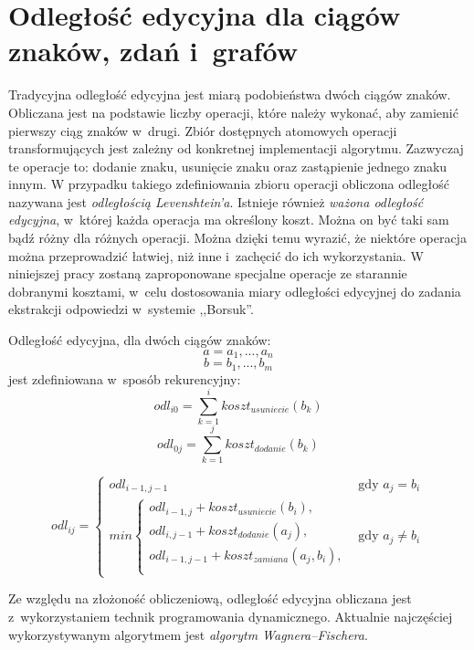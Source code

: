 \documentclass[a4paper, twoside, openright, 12pt]{report}
\begin{document}
    \section{Odległość edycyjna dla ciągów znaków, zdań i~grafów}
        Tradycyjna odległość edycyjna jest miarą podobieństwa dwóch ciągów znaków. Obliczana jest na podstawie liczby
        operacji, które należy wykonać, aby zamienić pierwszy ciąg znaków w~drugi. Zbiór dostępnych atomowych operacji
        transformujących jest zależny od konkretnej implementacji algorytmu. Zazwyczaj te operacje to: dodanie znaku,
        usunięcie znaku oraz zastąpienie jednego znaku innym. W przypadku takiego zdefiniowania zbioru operacji
        obliczona odległość nazywana jest \emph{odległością  Levenshtein'a}. Istnieje również \emph{ważona odległość edycyjna},
        w~której każda operacja ma określony koszt. Można on być taki sam bądź różny dla różnych operacji. Można dzięki
        temu wyrazić, że niektóre operacja można przeprowadzić łatwiej, niż inne i~zachęcić do ich wykorzystania.
        W niniejszej pracy zostaną zaproponowane specjalne operacje ze starannie dobranymi kosztami, w~celu dostosowania
        miary odległości edycyjnej do zadania ekstrakcji odpowiedzi w~systemie ,,Borsuk''.

        Odległość edycyjna, dla dwóch ciągów znaków:
        $$ a = a_1, ..., a_n $$
        $$ b = b_1, ..., b_m $$
        jest zdefiniowana w~sposób rekurencyjny\cite{CORMEN}:
            $$ odl_{i0} = \sum\limits_{k=1}^{i} koszt_{usuniecie}(b_k) $$
            $$ odl_{0j} = \sum\limits_{k=1}^{j} koszt_{dodanie}(b_k) $$

            \[
             odl_{ij} =
              \begin{cases}
                  odl_{i-1,j-1} & \text{gdy } a_j = b_i \\
                  min
                    \begin{cases}
                        odl_{i-1,j} + koszt_{usuniecie}(b_i), \\
                        odl_{i,j-1} + koszt_{dodanie}(a_j), \\
                        odl_{i-1,j-1} + koszt_{zamiana}(a_j, b_i), \\
                    \end{cases}
                    & \text{gdy } a_j \neq b_i
              \end{cases}
            \]

        Ze względu na złożoność obliczeniową, odległość edycyjna obliczana jest z~wykorzystaniem technik programowania
        dynamicznego. Aktualnie najczęściej wykorzystywanym algorytmem jest \emph{algorytm Wagnera–Fischera}.
\end{document}
